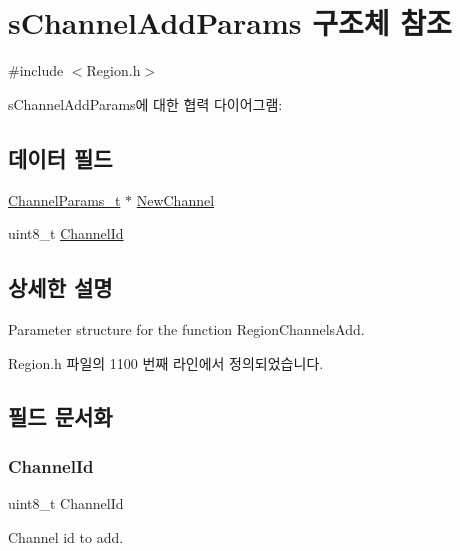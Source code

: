 \hypertarget{structs_channel_add_params}{}\section{s\+Channel\+Add\+Params 구조체 참조}
\label{structs_channel_add_params}


{\ttfamily \#include $<$Region.\+h$>$}



s\+Channel\+Add\+Params에 대한 협력 다이어그램\+:
\subsection*{데이터 필드}
\begin{DoxyCompactItemize}
\item 
\mbox{\hyperlink{group___l_o_r_a_m_a_c_ga1360ca6f82c6d125ea43a9dad9b56184}{Channel\+Params\+\_\+t}} $\ast$ \mbox{\hyperlink{structs_channel_add_params_afc31493a105479490228fd896b20b45c}{New\+Channel}}
\item 
uint8\+\_\+t \mbox{\hyperlink{structs_channel_add_params_ae23f953dc29c360e56a3c856404a3276}{Channel\+Id}}
\end{DoxyCompactItemize}


\subsection{상세한 설명}
Parameter structure for the function Region\+Channels\+Add. 

Region.\+h 파일의 1100 번째 라인에서 정의되었습니다.



\subsection{필드 문서화}
\mbox{\label{structs_channel_add_params_ae23f953dc29c360e56a3c856404a3276}} 
\subsubsection{\texorpdfstring{Channel\+Id}{ChannelId}}
{\footnotesize\ttfamily uint8\+\_\+t Channel\+Id}

Channel id to add. 

